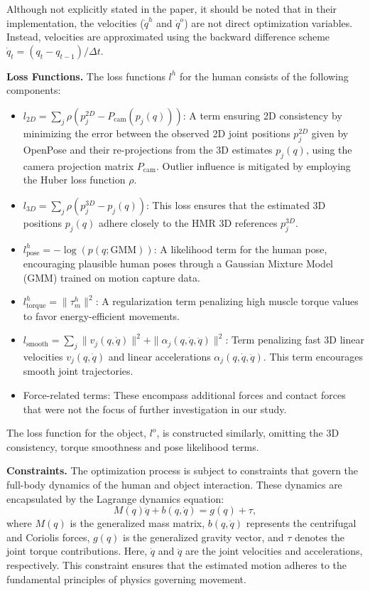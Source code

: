 Although not explicitly stated in the paper, it should be noted that in their implementation, the velocities (\(\dot{q}^h\) and \(\dot{q}^o\))
are not direct optimization variables. Instead, velocities are approximated using the backward difference scheme 
\(\dot{q}_t = (q_t - q_{t - 1}) / \Delta t\).

\noindent\textbf{Loss Functions.} The loss functions \(l^h\) for the human consists of the following components:

\begin{itemize}
    \item 
        \(l_{2D} = \sum_j \rho\left(p_j^{2D} - P_{\text{cam}}\left(p_j(q)\right)\right)\): A term ensuring 2D consistency by minimizing the error 
        between the observed 2D joint positions \(p_j^{2D}\) given by OpenPose and 
        their re-projections from the 3D estimates \(p_j(q)\), using the camera projection matrix \(P_{\text{cam}}\). Outlier influence is mitigated 
        by employing the Huber loss function \(\rho\).
    \item 
        \(l_{3D} = \sum_j \rho\left(p_j^{3D} -p_j(q)\right)\): This loss ensures that the estimated 3D positions \(p_j(q)\) adhere closely to the
         HMR 3D references \(p_j^{3D}\).
    \item 
        \(l_{\text{pose}}^h = -\log\left(p\left(q;\text{GMM}\right)\right)\): A likelihood term for the human pose, encouraging plausible human 
        poses through a Gaussian Mixture Model (GMM) trained on motion capture data.
    \item
        \(l_{\text{torque}}^h = \|\tau_m^h\|^2\): A regularization term penalizing high muscle torque values to favor energy-efficient movements.
    \item 
        \(l_{\text{smooth}} = \sum_{j} \|v_j(q, \dot{q})\|^2 + \|\alpha_j(q, \dot{q}, \ddot{q})\|^2\): Term penalizing fast 3D linear velocities 
        \(v_j(q, \dot{q})\) and linear accelerations \(\alpha_j(q, \dot{q}, \ddot{q})\). This term encourages smooth joint trajectories.
    \item
        Force-related terms: These encompass additional forces and contact forces that were not the focus of further investigation in our 
        study.
\end{itemize}

The loss function for the object, \(l^o\), is constructed similarly, omitting the 3D consistency, torque smoothness and pose likelihood terms.

\noindent\textbf{Constraints.} The optimization process is subject to constraints that govern the full-body dynamics of the human and object 
interaction. These dynamics are encapsulated by the Lagrange dynamics equation:
\[
M(q)\ddot{q} + b(q, \dot{q}) = g(q) + \tau,
\]
where \( M(q) \) is the generalized mass matrix, \( b(q, \dot{q}) \) represents the centrifugal and Coriolis forces, \( g(q) \) is the 
generalized gravity vector, and \( \tau \) denotes the joint torque contributions. Here, \( \dot{q} \) and \( \ddot{q} \) are the joint 
velocities and accelerations, respectively. This constraint ensures that the estimated motion adheres to the fundamental principles of physics 
governing movement.


